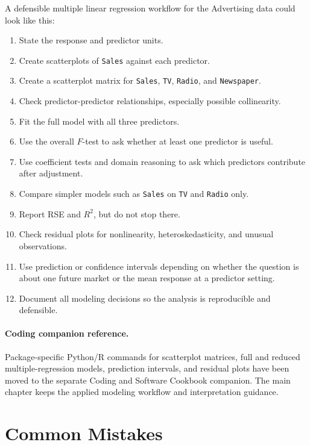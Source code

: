 A defensible multiple linear regression workflow for the Advertising data could look like this:
\begin{enumerate}
  \item State the response and predictor units.
  \item Create scatterplots of \texttt{Sales} against each predictor.
  \item Create a scatterplot matrix for \texttt{Sales}, \texttt{TV}, \texttt{Radio}, and \texttt{Newspaper}.
  \item Check predictor-predictor relationships, especially possible collinearity.
  \item Fit the full model with all three predictors.
  \item Use the overall \(F\)-test to ask whether at least one predictor is useful.
  \item Use coefficient tests and domain reasoning to ask which predictors contribute after adjustment.
  \item Compare simpler models such as \texttt{Sales} on \texttt{TV} and \texttt{Radio} only.
  \item Report RSE and \(R^2\), but do not stop there.
  \item Check residual plots for nonlinearity, heteroskedasticity, and unusual observations.
  \item Use prediction or confidence intervals depending on whether the question is about one future market or the mean response at a predictor setting.
  \item Document all modeling decisions so the analysis is reproducible and defensible.
\end{enumerate}


\paragraph{Coding companion reference.}
Package-specific Python/R commands for scatterplot matrices, full and reduced multiple-regression models, prediction intervals, and residual plots have been moved to the separate Coding and Software Cookbook companion.  The main chapter keeps the applied modeling workflow and interpretation guidance.

\section{Common Mistakes}

